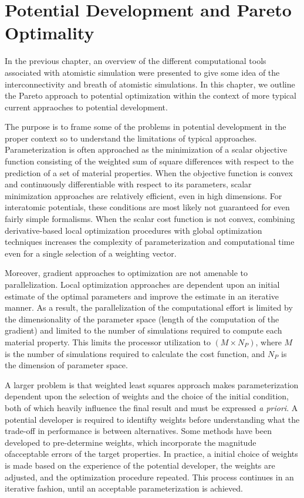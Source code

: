 \chapter{Potential Development and Pareto Optimality}
\label{ch:potential_development}

In the previous chapter, an overview of the different computational tools associated with atomistic simulation were presented to give some idea of the interconnectivity and breath of atomistic simulations.  In this chapter, we outline the Pareto approach to potential optimization within the context of more typical current appraoches to potential development.

The purpose is to frame some of the problems in potential development in the proper context so to understand the limitations of typical approaches.  Parameterization is often approached as the minimization of a scalar objective function consisting of the weighted sum of square differences with respect to the prediction of a set of material properties.  When the objective function is convex and continuously differentiable with respect to its parameters, scalar minimization approaches are relatively efficient, even in high dimensions.  For interatomic potentials, these conditions are most likely not guaranteed for even fairly simple formalisms.  When the scalar cost function is not convex, combining derivative-based local optimization procedures with global optimization techniques increases the complexity of parameterization and computational time even for a single selection of a weighting vector.

Moreover, gradient approaches to optimization are not amenable to parallelization.  Local optimization approaches are dependent upon an initial estimate of the optimal parameters and improve the estimate in an iterative manner.  As a result, the parallelization of the computational effort is limited by the dimensionality of the parameter space (length of the computation of the gradient) and limited to the number of simulations required to compute each material property.  This limits the processor utilization to $(M \times N_P)$, where $M$ is the number of simulations required to calculate the cost function, and $N_P$ is the dimension of parameter space.

A larger problem is that weighted least squares approach makes parameterization dependent upon the selection of weights and the choice of the initial condition, both of which heavily influence the final result and must be expressed \emph{a priori}. A potential developer is required to identifty weights before understanding what the trade-off in performance is between alternatives.  Some methods have been developed to pre-determine weights, which incorporate the magnitude ofacceptable errors of the target properties.\cite{martinez2013_fitting}  In practice, a initial choice of weights is made based on the experience of the potential developer, the weights are adjusted, and the optimization procedure repeated.  This process continues in an iterative fashion, until an acceptable parameterization is achieved.

